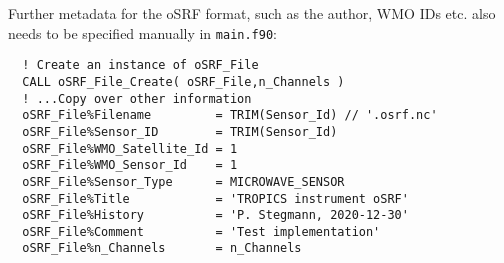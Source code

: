 Further metadata for the oSRF format, such as the author, WMO IDs etc. also needs to be specified manually in \verb|main.f90|:
\begin{verbatim}
  ! Create an instance of oSRF_File
  CALL oSRF_File_Create( oSRF_File,n_Channels )
  ! ...Copy over other information
  oSRF_File%Filename         = TRIM(Sensor_Id) // '.osrf.nc'
  oSRF_File%Sensor_ID        = TRIM(Sensor_Id)
  oSRF_File%WMO_Satellite_Id = 1
  oSRF_File%WMO_Sensor_Id    = 1
  oSRF_File%Sensor_Type      = MICROWAVE_SENSOR
  oSRF_File%Title            = 'TROPICS instrument oSRF'
  oSRF_File%History          = 'P. Stegmann, 2020-12-30'
  oSRF_File%Comment          = 'Test implementation'
  oSRF_File%n_Channels       = n_Channels
\end{verbatim}



